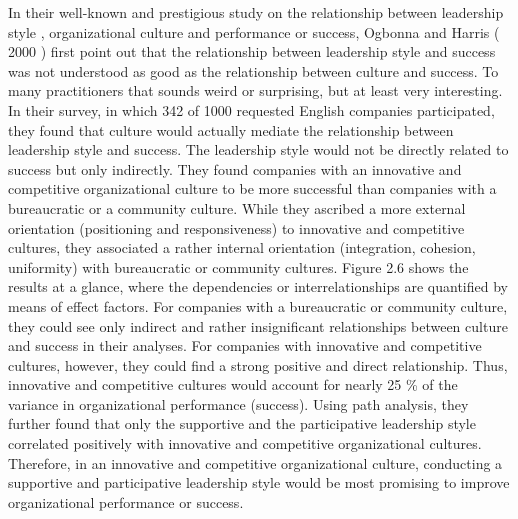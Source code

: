 {In their well-known and prestigious study on the relationship between leadership style , organizational culture and performance or success, Ogbonna and Harris ( 2000 ) first point out that the relationship between leadership style and success was not understood as good as the relationship between culture and success. To many practitioners that sounds weird or surprising, but at least very interesting. In their survey, in which 342 of 1000 requested English companies participated, they found that culture would actually mediate the relationship between leadership style and success. The leadership style would not be directly related to success but only indirectly. They found companies with an innovative and competitive organizational culture to be more successful than companies with a bureaucratic or a community culture. While they ascribed a more external orientation (positioning and responsiveness) to innovative and competitive cultures, they associated a rather internal orientation (integration, cohesion, uniformity) with bureaucratic or community cultures. Figure 2.6 shows the results at a glance, where the dependencies or interrelationships are quantified by means of effect factors. For companies with a bureaucratic or community culture, they could see only indirect and rather insignificant relationships between culture and success in their analyses. For companies with innovative and competitive cultures, however, they could find a strong positive and direct relationship. Thus, innovative and competitive cultures would account for nearly 25 \% of the variance in organizational performance (success). Using path analysis, they further found that only the supportive and the participative leadership style correlated positively with innovative and competitive organizational cultures. Therefore, in an innovative and competitive organizational culture, conducting a supportive and participative leadership style would be most promising to improve organizational performance or success.






\newpage
}

